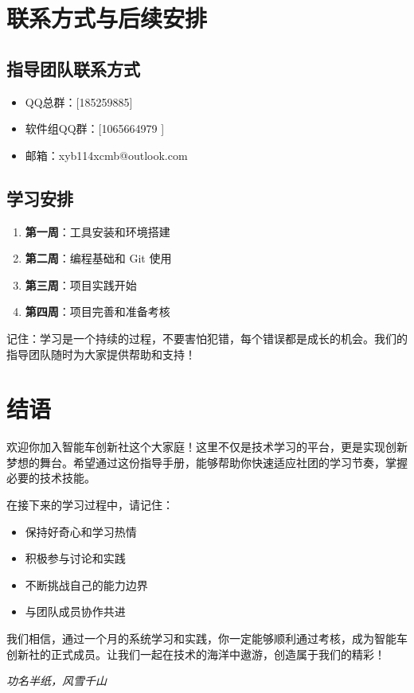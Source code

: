 \documentclass[a4paper,12pt]{article}
\begin{document}
\section{联系方式与后续安排}

\subsection{指导团队联系方式}
\begin{itemize}
    \item QQ总群：[185259885]
    \item 软件组QQ群：[1065664979 ]
    \item 邮箱：xyb114xcmb@outlook.com
\end{itemize}

\subsection{学习安排}
\begin{enumerate}
    \item \textbf{第一周}：工具安装和环境搭建
    \item \textbf{第二周}：编程基础和 Git 使用
    \item \textbf{第三周}：项目实践开始
    \item \textbf{第四周}：项目完善和准备考核
\end{enumerate}

\begin{tipbox}
记住：学习是一个持续的过程，不要害怕犯错，每个错误都是成长的机会。我们的指导团队随时为大家提供帮助和支持！
\end{tipbox}

\section{结语}

欢迎你加入智能车创新社这个大家庭！这里不仅是技术学习的平台，更是实现创新梦想的舞台。希望通过这份指导手册，能够帮助你快速适应社团的学习节奏，掌握必要的技术技能。

在接下来的学习过程中，请记住：
\begin{itemize}
    \item 保持好奇心和学习热情
    \item 积极参与讨论和实践
    \item 不断挑战自己的能力边界
    \item 与团队成员协作共进
\end{itemize}

我们相信，通过一个月的系统学习和实践，你一定能够顺利通过考核，成为智能车创新社的正式成员。让我们一起在技术的海洋中遨游，创造属于我们的精彩！

\vspace{2cm}
\begin{center}
\textit{功名半纸，风雪千山}
\end{center}
\end{document}
